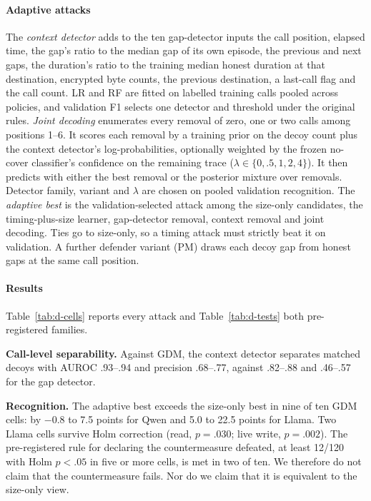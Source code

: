 \paragraph{Adaptive attacks}
The \emph{context detector} adds to the ten gap-detector inputs the call position, elapsed time, the gap's ratio to the median gap of its own episode, the previous and next gaps, the duration's ratio to the training median honest duration at that destination, encrypted byte counts, the previous destination, a last-call flag and the call count. LR and RF are fitted on labelled training calls pooled across policies, and validation F1 selects one detector and threshold under the original rules. \emph{Joint decoding} enumerates every removal of zero, one or two calls among positions 1--6. It scores each removal by a training prior on the decoy count plus the context detector's log-probabilities, optionally weighted by the frozen no-cover classifier's confidence on the remaining trace ($\lambda\in\{0,.5,1,2,4\}$). It then predicts with either the best removal or the posterior mixture over removals. Detector family, variant and $\lambda$ are chosen on pooled validation recognition. The \emph{adaptive best} is the validation-selected attack among the size-only candidates, the timing-plus-size learner, gap-detector removal, context removal and joint decoding. Ties go to size-only, so a timing attack must strictly beat it on validation. A further defender variant (PM) draws each decoy gap from honest gaps at the same call position.




\paragraph{Results}
Table~\ref{tab:d-cells} reports every attack and Table~\ref{tab:d-tests} both pre-registered families.

\textbf{Call-level separability.} Against GDM, the context detector separates matched decoys with AUROC .93--.94 and precision .68--.77, against .82--.88 and .46--.57 for the gap detector.

\textbf{Recognition.} The adaptive best exceeds the size-only best in nine of ten GDM cells: by $-0.8$ to 7.5 points for Qwen and 5.0 to 22.5 points for Llama. Two Llama cells survive Holm correction (read, $p=.030$; live write, $p=.002$). The pre-registered rule for declaring the countermeasure defeated, at least 12/120 with Holm $p<.05$ in five or more cells, is met in two of ten. We therefore do not claim that the countermeasure fails. Nor do we claim that it is equivalent to the size-only view.


